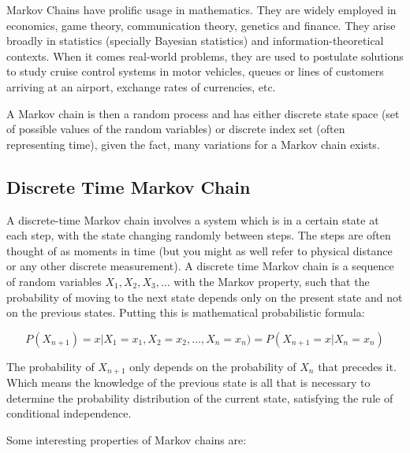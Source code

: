 Markov Chains have prolific usage in mathematics. They are widely employed in economics, game theory, communication theory, genetics and finance. They arise broadly in statistics (specially Bayesian statistics) and information-theoretical contexts. When it comes real-world problems, they are used to postulate solutions to study cruise control systems in motor vehicles, queues or lines of customers arriving at an airport, exchange rates of currencies, etc. 

A Markov chain is then a random process and has either discrete state space (set of possible values of the random variables) or discrete index set (often representing time), given the fact, many variations for a Markov chain exists. 

\subsection{Discrete Time Markov Chain}
A discrete-time Markov chain involves a system which is in a certain state at each step, with the state changing randomly between steps. The steps are often thought of as moments in time (but you might as well refer to physical distance or any other discrete measurement). A discrete time Markov chain is a sequence of random variables $X_1, X_2, X_3,\ldots$ with the Markov property, such that the probability of moving to the next state depends only on the present state and not on the previous states. Putting this is mathematical probabilistic formula:

\begin{equation}
P(X_{n+1}) = x | X_1 = x_1, X_2 = x_2, \ldots, X_n = x_n) = P( X_{n+1} = x | X_n = x_n)
\end{equation}

The probability of $X_{n+1}$ only depends on the probability of $X_n$ that precedes it. Which means the knowledge of the previous state is all that is necessary to determine the probability distribution of the current state, satisfying the rule of conditional independence.

Some interesting properties of Markov chains are:

